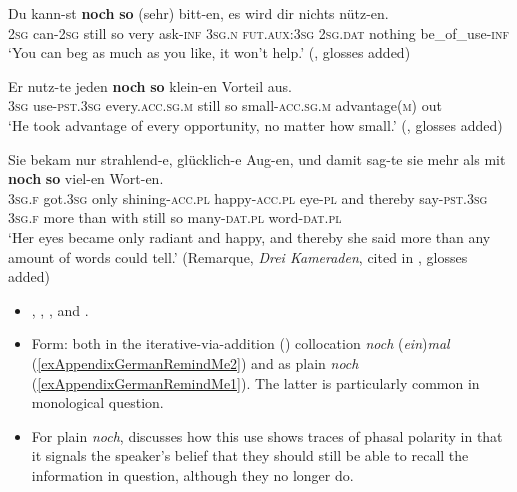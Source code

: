 \begin{exe}
	\ex\label{exAppendixGermanNochSo1}
	\gll Du kann-st \textbf{noch} \textbf{so} \textup{(}sehr\textup{)} bitt-en, es wird dir nichts nütz-en.\\
	2\textsc{sg} can-2\textsc{sg} still so \phantom{(}very ask-\textsc{inf} 3\textsc{sg}.\textsc{n} \textsc{fut}.\textsc{aux}:3\textsc{sg} 2\textsc{sg}.\textsc{dat} nothing be\_of\_use-\textsc{inf}\\
	\glt \lq You can beg as much as you like, it won't help.\rq{ }(\cite[s.v. \textit{noch}]{Duden}, glosses added)

	\ex\label{exAppendixGermanNochSo2}
	\gll Er nutz-te jeden \textbf{noch} \textbf{so} klein-en Vorteil aus.\\
	3\textsc{sg} use-\textsc{pst}.3\textsc{sg} every.\textsc{acc}.\textsc{sg}.\textsc{m} still so small-\textsc{acc}.\textsc{sg}.\textsc{m} advantage(\textsc{m}) out\\
	\glt \lq He took advantage of every opportunity, no matter how small.' (\cite[s.v. \textit{noch}]{DWDS}, glosses added)

	\ex\label{exAppendixGermanNochSo3}
	 \gll Sie bekam nur strahlend-e, glücklich-e Aug-en, und damit sag-te sie mehr als mit \textbf{noch} \textbf{so} viel-en Wort-en.\\
	3\textsc{sg}.\textsc{f} got.3\textsc{sg} only shining-\textsc{acc}.\textsc{pl} happy-\textsc{acc}.\textsc{pl} eye-\textsc{pl} and thereby say-\textsc{pst}.3\textsc{sg} 3\textsc{sg}.\textsc{f} more than with still so many-\textsc{dat}.\textsc{pl} word-\textsc{dat}.\textsc{pl}\\
	\glt \lq Her eyes became only radiant and happy, and thereby she said more than any amount of words could tell.' (Remarque, \textit{Drei Kameraden}, cited in \cite[62]{Shetter1966}, glosses added)
\end{exe}

\label{appendixGermanRemindMe}
\begin{itemize}
	\item \textcite[s.v. \textit{noch}]{DWDS}, \textcite{Iwasaki1977}, \textcite[176]{KoenigEtAl1993}, \textcite[634]{MetrichFaucher2009} and \textcite{Sauerland2009}.
	\item Form: both in the iterative-via-addition () collocation \textit{noch} (\textit{ein})\textit{mal} (\ref{exAppendixGermanRemindMe2}) and as plain \textit{noch} (\ref{exAppendixGermanRemindMe1}). The latter is particularly common in monological question.
	\item For plain \textit{noch}, \textcite{Iwasaki1977} discusses how this use shows traces of phasal polarity in that it signals the speaker's belief that they should still be able to recall the information in question, although they no longer do.
\end{itemize}

